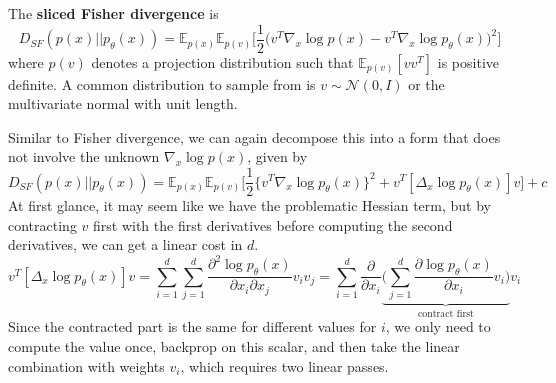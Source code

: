 \documentclass{article}
\begin{document}
    \begin{definition}
      The \textbf{sliced Fisher divergence} is 
      \begin{equation}
        D_{SF} (p(x) || p_\theta (x)) = \mathbb{E}_{p(x)} \mathbb{E}_{p(v)} \bigg[ \frac{1}{2} \big( v^T \nabla_x \log p (x) - v^T \nabla_x \log p_\theta (x) \big)^2 \bigg]
      \end{equation}
      where $p(v)$ denotes a projection distribution such that $\mathbb{E}_{p(v)} [v v^T]$ is positive definite. A common distribution to sample from is $v \sim \mathcal{N}(0, I)$ or the multivariate normal with unit length. 
    \end{definition} 

    Similar to Fisher divergence, we can again decompose this into a form that does not involve the unknown $\nabla_x \log p(x)$, given by 
    \begin{equation}
      D_{SF} (p(x) || p_\theta(x)) = \mathbb{E}_{p(x)} \mathbb{E}_{p(v)} \bigg[ \frac{1}{2} \{ v^T \nabla_x \log p_\theta (x) \}^2 + v^T [\Delta_x \log p_\theta (x)]v \bigg] + c
    \end{equation}
    At first glance, it may seem like we have the problematic Hessian term, but by contracting $v$ first with the first derivatives before computing the second derivatives, we can get a linear cost in $d$. 
    \begin{equation}
      v^T [\Delta_x \log p_\theta (x)]v = \sum_{i=1}^d \sum_{j=1}^d \frac{\partial^2 \log p_\theta (x)}{\partial x_i \partial x_j} v_i v_j = \sum_{i=1}^d \frac{\partial}{\partial x_i} \underbrace{\bigg( \sum_{j=1}^d \frac{\partial \log p_\theta (x)}{\partial x_i} v_i \bigg)}_{\text{contract first}} v_i
    \end{equation}
    Since the contracted part is the same for different values for $i$, we only need to compute the value once, backprop on this scalar, and then take the linear combination with weights $v_i$, which requires two linear passes. 
\end{document}
